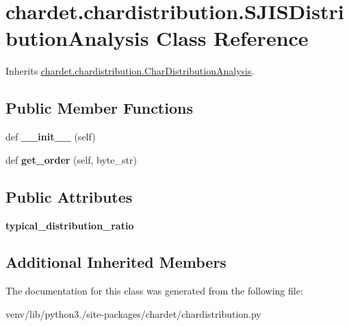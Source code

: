 \hypertarget{classchardet_1_1chardistribution_1_1_s_j_i_s_distribution_analysis}{}\section{chardet.\+chardistribution.\+S\+J\+I\+S\+Distribution\+Analysis Class Reference}
\label{classchardet_1_1chardistribution_1_1_s_j_i_s_distribution_analysis}


Inherits \hyperlink{classchardet_1_1chardistribution_1_1_char_distribution_analysis}{chardet.\+chardistribution.\+Char\+Distribution\+Analysis}.

\subsection*{Public Member Functions}
\begin{DoxyCompactItemize}
\item 
\mbox{\label{classchardet_1_1chardistribution_1_1_s_j_i_s_distribution_analysis_a7ac2f8bd4539f8fe7675432eebf0ecb8}} 
def {\bfseries \+\_\+\+\_\+init\+\_\+\+\_\+} (self)
\item 
\mbox{\label{classchardet_1_1chardistribution_1_1_s_j_i_s_distribution_analysis_ae062adb058891a6f87a23ab02f0c044f}} 
def {\bfseries get\+\_\+order} (self, byte\+\_\+str)
\end{DoxyCompactItemize}
\subsection*{Public Attributes}
\begin{DoxyCompactItemize}
\item 
\mbox{\label{classchardet_1_1chardistribution_1_1_s_j_i_s_distribution_analysis_a07fafccc1e07d278cb4e8ee39e287c9b}} 
{\bfseries typical\+\_\+distribution\+\_\+ratio}
\end{DoxyCompactItemize}
\subsection*{Additional Inherited Members}


The documentation for this class was generated from the following file\+:\begin{DoxyCompactItemize}
\item 
venv/lib/python3./site-\/packages/chardet/chardistribution.\+py\end{DoxyCompactItemize}
